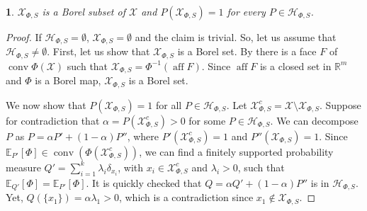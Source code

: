 \documentclass[10pt, a4paper]{article}
\newcommand{\E}{\mathbb E}
\newcommand{\Hh}{\mathcal H}
\newcommand{\HhP}{\Hh_{\Phi,S}}
\newcommand{\R}{\mathbb R}
\newcommand{\X}{\mathcal X}
\newcommand{\XP}{\X_{\Phi,S}}
\DeclareMathOperator{\aff}{aff}
\DeclareMathOperator{\conv}{conv}
\newcommand{\reptile}{}
\newtheorem*{repinner}{\reptile}
\newenvironment{reflem}[1]{%
  \renewcommand{\reptile}{Lemma \ref{#1}}%
  \begin{repinner}
}{%
  \end{repinner}
}
\begin{document}
    \begin{reflem}{lemma:XP}
        $\XP$ is a Borel subset of $\X$ and $P(\XP)=1$ for every $P\in\HhP$.
    \end{reflem}
    \begin{proof}
        If $\HhP=\emptyset$, $\XP=\emptyset$ and the claim is trivial. So, let us assume that $\HhP\neq\emptyset$. First, let us show that $\XP$ is a Borel set. By  there is a face $F$ of $\conv\Phi(\X)$ such that  $\XP = \Phi^{-1}(\aff F)$. Since $\aff F$ is a closed set in $\R^m$ and $\Phi$ is a Borel map, $\XP$ is a Borel set.

        We now show that $P(\XP)=1$ for all $P\in\HhP$. Let $\XP^c=\X\setminus\XP$. Suppose for contradiction that $\alpha = P(\XP^c)>0$ for some $P\in\HhP$. We can decompose $P$ as $P = \alpha P' + (1-\alpha)P''$, where $P'(\XP^c) = 1$ and $P''(\XP) = 1$. Since $\E_{P'}[\Phi]\in\conv(\Phi(\XP^c))$, we can find a finitely supported probability measure $Q' = \sum_{i=1}^k \lambda_i\delta_{x_i}$, with $x_i\in\XP^c$ and $\lambda_i>0$, such that $\E_{Q'}[\Phi] = \E_{P'}[\Phi]$. It is quickly checked that $Q = \alpha Q' + (1-\alpha)P''$ is in $\HhP$. Yet, $Q(\{x_1\}) = \alpha\lambda_1>0$, which is a contradiction since $x_1\notin\XP$.
    \end{proof}
\end{document}
